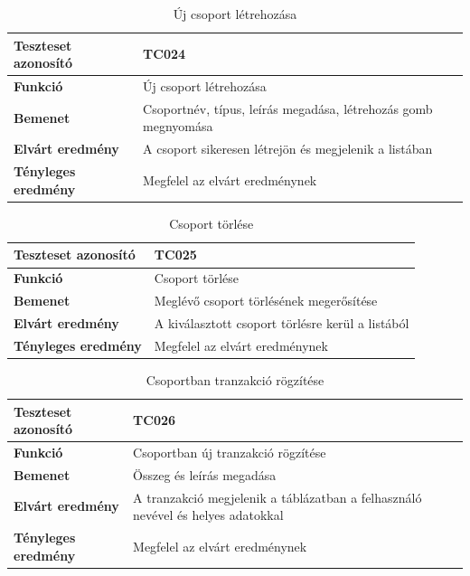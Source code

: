 \begin{table}[h!]
	\centering
	\begin{tabular}{|l|p{10cm}|}
		\hline
		\textbf{Teszteset azonosító} & TC024 \\ \hline
		\textbf{Funkció} & Új csoport létrehozása \\ \hline
		\textbf{Bemenet} & Csoportnév, típus, leírás megadása, létrehozás gomb megnyomása \\ \hline
		\textbf{Elvárt eredmény} & A csoport sikeresen létrejön és megjelenik a listában \\ \hline
		\textbf{Tényleges eredmény} & Megfelel az elvárt eredménynek \\ \hline
	\end{tabular}
	\caption{Új csoport létrehozása}
	\label{tab:csoport_letrehozas}
\end{table}

\begin{table}[h!]
	\centering
	\begin{tabular}{|l|p{10cm}|}
		\hline
		\textbf{Teszteset azonosító} & TC025 \\ \hline
		\textbf{Funkció} & Csoport törlése \\ \hline
		\textbf{Bemenet} & Meglévő csoport törlésének megerősítése \\ \hline
		\textbf{Elvárt eredmény} & A kiválasztott csoport törlésre kerül a listából \\ \hline
		\textbf{Tényleges eredmény} & Megfelel az elvárt eredménynek \\ \hline
	\end{tabular}
	\caption{Csoport törlése}
	\label{tab:csoport_torles}
\end{table}

\begin{table}[h!]
	\centering
	\begin{tabular}{|l|p{10cm}|}
		\hline
		\textbf{Teszteset azonosító} & TC026 \\ \hline
		\textbf{Funkció} & Csoportban új tranzakció rögzítése \\ \hline
		\textbf{Bemenet} & Összeg és leírás megadása \\ \hline
		\textbf{Elvárt eredmény} & A tranzakció megjelenik a táblázatban a felhasználó nevével és helyes adatokkal \\ \hline
		\textbf{Tényleges eredmény} & Megfelel az elvárt eredménynek \\ \hline
	\end{tabular}
	\caption{Csoportban tranzakció rögzítése}
	\label{tab:csoport_kiadas_rogzitese}
\end{table}

